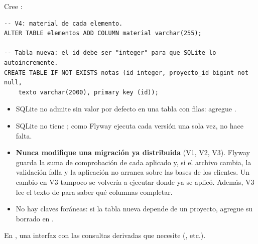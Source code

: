\par\medskip\noindent{}\hspace{0.5em}{\bfseries Escribir la migración}\par\nopagebreak\smallskip

Cree :

\begin{verbatim}
-- V4: material de cada elemento.
ALTER TABLE elementos ADD COLUMN material varchar(255);

-- Tabla nueva: el id debe ser "integer" para que SQLite lo autoincremente.
CREATE TABLE IF NOT EXISTS notas (id integer, proyecto_id bigint not null,
    texto varchar(2000), primary key (id));
\end{verbatim}

\begin{itemize}
	\item SQLite no admite  sin valor por defecto en una tabla con filas: agregue
	      .
	\item SQLite no tiene ; como Flyway ejecuta cada versión una sola vez, no hace falta.
	\item \textbf{Nunca modifique una migración ya distribuida} (V1, V2, V3). Flyway guarda la suma de comprobación de
	      cada  aplicado y, si el archivo cambia, la validación falla y la aplicación no arranca sobre las bases
	      de los clientes. Un cambio en V3 tampoco se volvería a ejecutar donde ya se aplicó. Además, V3 lee el texto de
	       para saber qué columnas completar.
	\item No hay claves foráneas: si la tabla nueva depende de un proyecto, agregue su borrado en
	      .
\end{itemize}

\par\medskip\noindent{}\hspace{0.5em}{\bfseries Crear o ampliar el repositorio}\par\nopagebreak\smallskip

En , una interfaz  con las consultas derivadas que
necesite (, etc.).

\par\medskip\noindent{}\hspace{0.5em}{\bfseries Probar el esquema}\par\nopagebreak\smallskip

